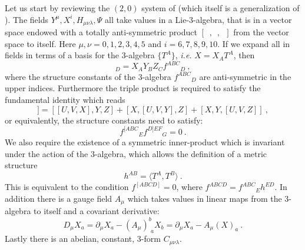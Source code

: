 \documentclass[12pt]{article}
\numberwithin{equation}{section}
\begin{document}
Let us start by reviewing the $(2,0)$ system of \cite{Lambert:2016xbs} (which itself is a generalization of \cite{Lambert:2010wm}). The fields  $Y^\mu,X^i,H_{\mu\nu\lambda},\Psi$ all take values in a Lie-3-algebra, that is in a vector space  endowed with a totally anti-symmetric product $[\,\,\,,\,\,\,,\,\,\,]$ from the vector space to itself. Here $\mu,\nu=0,1,2,3,4,5$ and $i=6,7,8,9,10$.
If we expand all in fields in terms of a basis for the 3-algebra  $\{T^A\}$, {\it i.e.} $X=X_A T^A$, then  
\begin{equation}
[X,Y,Z]_D=X_AY_BZ_C f^{ABC}{}_{ D}\ ,
\end{equation}
where the structure constants of the 3-algebra $f^{ABC}{}_{ D}$ are anti-symmetric in the upper indices.  Furthermore the triple product is required to satisfy the  fundamental identity which reads
\begin{equation}
[U,V,[X,Y,Z]] = [[U,V,X],Y,Z]+ [X,[U,V,Y],Z]+ [X,Y,[U,V,Z]]\ ,
\end{equation}
or equivalently, the structure constants need to satisfy:
\begin{equation}
f^{[ABC}{}_{E} f^{D]EF}{}_{G}=0\ .
\end{equation}
We also require the existence of a symmetric inner-product which is invariant under the action of the 3-algebra, which allows the definition of a metric structure
\begin{equation}
h^{AB}=\langle T^A,T^B\rangle\ .
\end{equation}
This is equivalent to the condition $f^{[ABCD]}=0$, where $f^{ABCD}=f^{ABC}{}_Eh^{ED}$. In addition there is a gauge field $A_\mu$ which takes values in linear maps from the 3-algebra to itself and a covariant derivative:
\begin{equation}
D_\mu X_a=\partial_\mu X_a-(A_\mu)^b_{\,\,a} X_b=\partial_\mu X_a-A_\mu(X)_a\ .
\end{equation}
Lastly there is an abelian, constant, 3-form $C_{\mu\nu\lambda}$.
\end{document}
